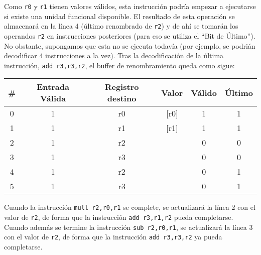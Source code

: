 \begin{ejercicio}
    Como \verb|r0| y \verb|r1| tienen valores válidos, esta instrucción podría empezar a ejecutarse si existe una unidad funcional
    disponible. El resultado de esta operación se almacenará en la línea 4 (último renombrado de \verb|r2|) y de ahí se
    tomarán los operandos \verb|r2| en instrucciones posteriores (para eso se utiliza el ``Bit de Último'').
    No obstante, supongamos que esta no se ejecuta todavía (por ejemplo, se podrián decodificar 4 instrucciones a la vez). Tras la decodificación de la última instrucción, \verb|add r3,r3,r2|, el buffer de renombramiento queda como sigue:
    \begin{center}
        \scriptsize
        \begin{tabular}{|c|c|c|c|c|c|}
            \hline
            \# & Entrada Válida & Registro destino & Valor & Válido & Último \\
            \hline
            0 & 1 & r0 & [r0] & 1 & 1 \\
            1 & 1 & r1 & [r1] & 1 & 1 \\
            2 & 1 & r2 &  & 0 & 0 \\
            3 & 1 & r3 &  & 0 & 0 \\
            4 & 1 & r2 &  & 0 & 1 \\
            5 & 1 & r3 &  & 0 & 1 \\
            \hline
        \end{tabular}
    \end{center}

    Cuando la instrucción \verb|mull r2,r0,r1| se complete, se actualizará la línea 2 con el valor de \verb|r2|,
    de forma que la instrucción \verb|add r3,r1,r2| pueda completarse. Cuando además se termine la instrucción \verb|sub r2,r0,r1|, se actualizará la línea 3 con el valor de \verb|r2|, de forma que la instrucción \verb|add r3,r3,r2|
    ya pueda completarse.
\end{ejercicio}

